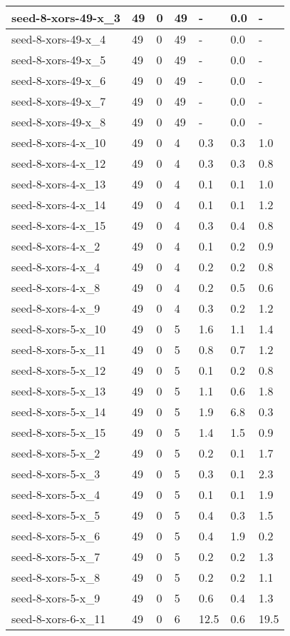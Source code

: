 \begin{scriptsize}
\begin{longtable}{|p{5cm}|l|l|l|l|l|l|}
seed-8-xors-49-x\_3&49&0&49&-&0.0&- \\ \hline 
seed-8-xors-49-x\_4&49&0&49&-&0.0&- \\ \hline 
seed-8-xors-49-x\_5&49&0&49&-&0.0&- \\ \hline 
seed-8-xors-49-x\_6&49&0&49&-&0.0&- \\ \hline 
seed-8-xors-49-x\_7&49&0&49&-&0.0&- \\ \hline 
seed-8-xors-49-x\_8&49&0&49&-&0.0&- \\ \hline 
seed-8-xors-4-x\_10&49&0&4&0.3&0.3&1.0 \\ \hline 
seed-8-xors-4-x\_12&49&0&4&0.3&0.3&0.8 \\ \hline 
seed-8-xors-4-x\_13&49&0&4&0.1&0.1&1.0 \\ \hline 
seed-8-xors-4-x\_14&49&0&4&0.1&0.1&1.2 \\ \hline 
seed-8-xors-4-x\_15&49&0&4&0.3&0.4&0.8 \\ \hline 
seed-8-xors-4-x\_2&49&0&4&0.1&0.2&0.9 \\ \hline 
seed-8-xors-4-x\_4&49&0&4&0.2&0.2&0.8 \\ \hline 
seed-8-xors-4-x\_8&49&0&4&0.2&0.5&0.6 \\ \hline 
seed-8-xors-4-x\_9&49&0&4&0.3&0.2&1.2 \\ \hline 
seed-8-xors-5-x\_10&49&0&5&1.6&1.1&1.4 \\ \hline 
seed-8-xors-5-x\_11&49&0&5&0.8&0.7&1.2 \\ \hline 
seed-8-xors-5-x\_12&49&0&5&0.1&0.2&0.8 \\ \hline 
seed-8-xors-5-x\_13&49&0&5&1.1&0.6&1.8 \\ \hline 
seed-8-xors-5-x\_14&49&0&5&1.9&6.8&0.3 \\ \hline 
seed-8-xors-5-x\_15&49&0&5&1.4&1.5&0.9 \\ \hline 
seed-8-xors-5-x\_2&49&0&5&0.2&0.1&1.7 \\ \hline 
seed-8-xors-5-x\_3&49&0&5&0.3&0.1&2.3 \\ \hline 
seed-8-xors-5-x\_4&49&0&5&0.1&0.1&1.9 \\ \hline 
seed-8-xors-5-x\_5&49&0&5&0.4&0.3&1.5 \\ \hline 
seed-8-xors-5-x\_6&49&0&5&0.4&1.9&0.2 \\ \hline 
seed-8-xors-5-x\_7&49&0&5&0.2&0.2&1.3 \\ \hline 
seed-8-xors-5-x\_8&49&0&5&0.2&0.2&1.1 \\ \hline 
seed-8-xors-5-x\_9&49&0&5&0.6&0.4&1.3 \\ \hline 
seed-8-xors-6-x\_11&49&0&6&12.5&0.6&19.5 \\ \hline 

\end{longtable}
\end{scriptsize}
